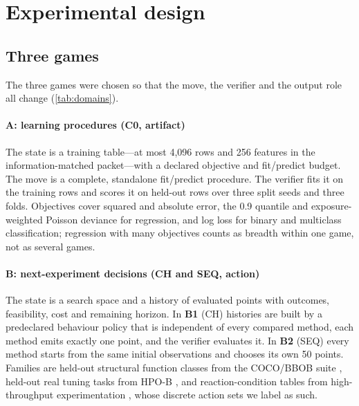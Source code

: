 \section{Experimental design}
\label{sec:design}

\subsection{Three games}

The three games were chosen so that the move, the verifier and the output role all change
(\cref{tab:domains}).

\paragraph{A: learning procedures (C0, artifact)} The state is a training table---at most 4,096 rows
and 256 features in the information-matched packet---with a declared objective and fit/predict
budget. The move is a complete, standalone fit/predict procedure. The verifier fits it on the
training rows and scores it on held-out rows over three split seeds and three folds. Objectives cover
squared and absolute error, the 0.9 quantile and exposure-weighted Poisson deviance for regression,
and log loss for binary and multiclass classification; regression with many objectives counts as
breadth within one game, not as several games.

\paragraph{B: next-experiment decisions (CH and SEQ, action)} The state is a search space and a
history of evaluated points with outcomes, feasibility, cost and remaining horizon. In \textbf{B1}
(CH) histories are built by a predeclared behaviour policy that is independent of every compared
method, each method emits exactly one point, and the verifier evaluates it. In \textbf{B2} (SEQ)
every method starts from the same initial observations and chooses its own 50 points. Families are
held-out structural function classes from the COCO/BBOB suite \citep{hansen2021coco}, held-out real
tuning tasks from HPO-B \citep{pineda2021hpob}, and reaction-condition tables from high-throughput
experimentation \citep{ahneman2018cn,shields2021reaction}, whose discrete action sets we label as such.

